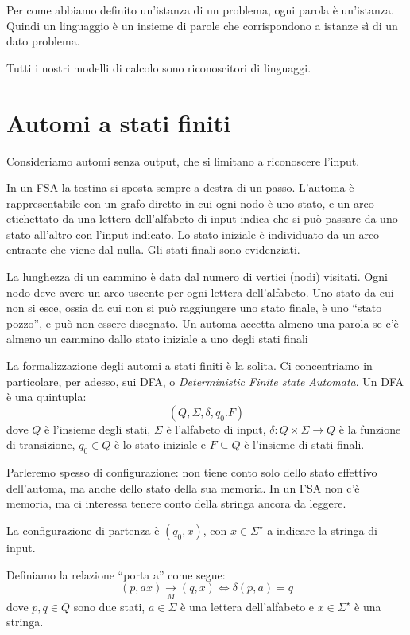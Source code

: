 Per come abbiamo definito un'istanza di un problema, ogni parola \`e un'istanza.
Quindi un linguaggio \`e un insieme di parole che corrispondono a istanze s\`i di un dato problema.

Tutti i nostri modelli di calcolo sono riconoscitori di linguaggi.

\section{Automi a stati finiti}

Consideriamo automi senza output, che si limitano a riconoscere l'input.

In un FSA la testina si sposta sempre a destra di un passo.
L'automa \`e rappresentabile con un grafo diretto in cui ogni nodo \`e uno stato, e un arco etichettato da una lettera dell'alfabeto di input  indica che si pu\`o passare da uno stato all'altro con l'input indicato.
Lo stato iniziale \`e individuato da un arco entrante che viene dal nulla.
Gli stati finali sono evidenziati.

La lunghezza di un cammino \`e data dal numero di vertici (nodi) visitati.
Ogni nodo deve avere un arco uscente per ogni lettera dell'alfabeto.
Uno stato da cui non si esce, ossia da cui non si pu\`o raggiungere uno stato finale, \`e uno ``stato pozzo'', e pu\`o non essere disegnato.
Un automa accetta almeno una parola se c'\`e almeno un cammino dallo stato iniziale a uno degli stati finali

La formalizzazione degli automi a stati finiti \`e la solita.
Ci concentriamo in particolare, per adesso, sui DFA, o \emph{Deterministic Finite state Automata}.
Un DFA \`e una quintupla: 
\[
	(Q, \Sigma, \delta, q_0. F)
\]
dove $Q$ \`e l'insieme degli stati, $\Sigma$ \`e l'alfabeto di input, $\delta : Q \times \Sigma \to Q$ \`e la funzione di transizione, $q_0 \in Q$ \`e lo stato iniziale e $F \subseteq Q$ \`e l'insieme di stati finali.

Parleremo spesso di configurazione: non tiene conto solo dello stato effettivo dell'automa, ma anche dello stato della sua memoria.
In un FSA non c'\`e memoria, ma ci interessa tenere conto della stringa ancora da leggere.

La configurazione di partenza \`e $(q_0, x)$, con $x \in \Sigma^{\star}$ a indicare la stringa di input.

Definiamo la relazione ``porta a'' come segue:
\[
	(p, ax) \underset{M}{\to} (q,x) \iff \delta(p,a) = q
\]
dove $p,q \in Q$ sono due stati, $a \in \Sigma$ \`e una lettera dell'alfabeto e $x \in \Sigma^{\star}$ \`e una stringa.

